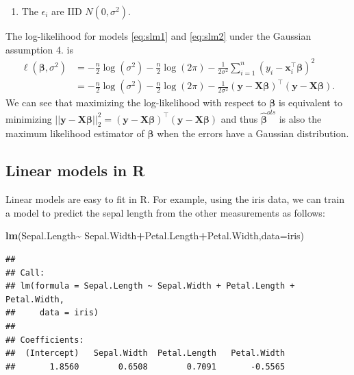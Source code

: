 \documentclass[
]{book}
\newenvironment{Shaded}{\begin{snugshade}}{\end{snugshade}}
\newcommand{\AttributeTok}[1]{\textcolor[rgb]{0.13,0.29,0.53}{#1}}
\newcommand{\FunctionTok}[1]{\textcolor[rgb]{0.13,0.29,0.53}{\textbf{#1}}}
\newcommand{\NormalTok}[1]{#1}
\newcommand{\SpecialCharTok}[1]{\textcolor[rgb]{0.81,0.36,0.00}{\textbf{#1}}}
\providecommand{\tightlist}{%
  \setlength{\itemsep}{0pt}\setlength{\parskip}{0pt}}
\theoremstyle{definition}
\theoremstyle{definition}
\theoremstyle{definition}
\theoremstyle{definition}
\theoremstyle{remark}
\begin{document}
\begin{enumerate}
\def\labelenumi{\arabic{enumi}.}
\setcounter{enumi}{3}
\tightlist
\item
  The \(\epsilon_i\) are IID \(N(0, \sigma^2)\).
\end{enumerate}

The log-likelihood for models \eqref{eq:slm1} and \eqref{eq:slm2} under the Gaussian assumption 4. is
\begin{align*}
\ell(\boldsymbol \beta, \sigma^2)&=-\frac{n}{2}\log (\sigma^2)-\frac{n}{2}\log(2\pi)-\frac{1}{2\sigma^2} \sum_{i=1}^n (y_i-\mathbf x_i^\top \boldsymbol \beta)^2\\
& = -\frac{n}{2}\log (\sigma^2)-\frac{n}{2}\log(2\pi)-\frac{1}{2\sigma^2} (\mathbf y- \mathbf X\boldsymbol \beta)^\top (\mathbf y- \mathbf X\boldsymbol \beta).
\end{align*}
We can see that maximizing the log-likelihood with respect to \(\boldsymbol \beta\) is equivalent to minimizing \(||\mathbf y- \mathbf X\boldsymbol \beta||_2^2=(\mathbf y- \mathbf X\boldsymbol \beta)^\top (\mathbf y- \mathbf X\boldsymbol \beta)\)
and thus \(\hat{\boldsymbol \beta}^{ols}\) is also the maximum likelihood estimator of \(\boldsymbol \beta\) when the errors have a Gaussian distribution.

\subsection{Linear models in R}\label{linear-models-in-r}

Linear models are easy to fit in R. For example, using the iris data, we can train a model to predict the sepal length from the other measurements as follows:

\begin{Shaded}
\begin{Highlighting}[]
\FunctionTok{lm}\NormalTok{(Sepal.Length}\SpecialCharTok{\textasciitilde{}}\NormalTok{ Sepal.Width}\SpecialCharTok{+}\NormalTok{Petal.Length}\SpecialCharTok{+}\NormalTok{Petal.Width,}\AttributeTok{data=}\NormalTok{iris)}
\end{Highlighting}
\end{Shaded}

\begin{verbatim}
## 
## Call:
## lm(formula = Sepal.Length ~ Sepal.Width + Petal.Length + Petal.Width, 
##     data = iris)
## 
## Coefficients:
##  (Intercept)   Sepal.Width  Petal.Length   Petal.Width  
##       1.8560        0.6508        0.7091       -0.5565
\end{verbatim}
\end{document}
